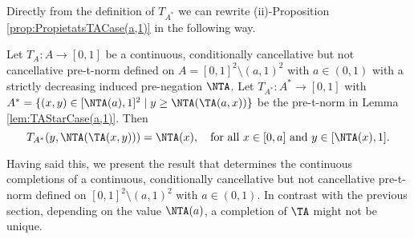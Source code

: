Directly from the definition of $T_{A^*}$ we can rewrite (ii)-Proposition \ref{prop:PropietatsTACase(a,1)} in the following way.

\begin{corollary}\label{Cor:PropertyTAStarCase(a,1)}
	Let $T_A: A \to [0,1]$ be a continuous, conditionally cancellative but not cancellative pre-t-norm defined on $A=[0,1]^2 \setminus (a,1)^2$ with $a \in (0,1)$ with a strictly decreasing induced pre-negation $\NTA$. Let $T_{A^*}:A^* \to [0,1]$ with $A^* = \{(x,y) \in [\NTA(a),1]^2 \mid y \geq \NTA(\TA(a,x))\}$ be the pre-t-norm in Lemma \ref{lem:TAStarCase(a,1)}. Then
	$$T_{A^*}(y,\NTA(\TA(x,y)))=\NTA(x), \quad \text{for all } x \in [0,a] \text{ and } y \in [\NTA(x),1].$$
\end{corollary}

Having said this, we present the result that determines the continuous completions of a continuous, conditionally cancellative but not cancellative pre-t-norm defined on $[0,1]^2 \setminus (a,1)^2$ with $a \in (0,1)$. In contrast with the previous section, depending on the value $\NTA(a)$, a completion of $\TA$ might not be unique.


